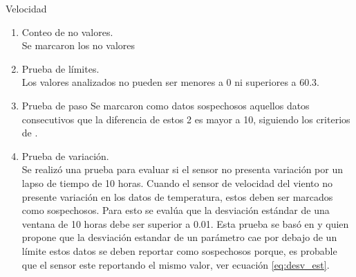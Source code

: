 \documentclass[11pt]{article}
\begin{document}
Velocidad

\begin{enumerate}
\item Conteo de no valores.\\
Se marcaron los no valores

\item Prueba de límites.\\
Los valores analizados no pueden ser menores a 0 ni superiores a 60.3.

\item Prueba de paso
Se marcaron como datos sospechosos aquellos datos consecutivos que la diferencia de estos 2 es mayor a 10, siguiendo los criterios de \citep{estevez2011}.

\item Prueba de variación.\\

Se realizó una prueba para evaluar si el sensor no presenta variación por un lapso de tiempo de 10 horas. Cuando el sensor de velocidad del viento no presente variación en los datos de temperatura, estos deben ser marcados como sospechosos. Para esto se evalúa que la desviación estándar de una ventana de 10 horas debe ser superior a 0.01. Esta prueba  se basó en \citet{zahumensky2004} y \citet{Shafer2000} quien propone que la desviación estandar de un parámetro cae por debajo de un límite estos datos se deben reportar como sospechosos porque, es probable que el sensor este reportando el mismo valor, ver ecuación \ref{eq:desv_est}.

\end{enumerate}
\end{document}
